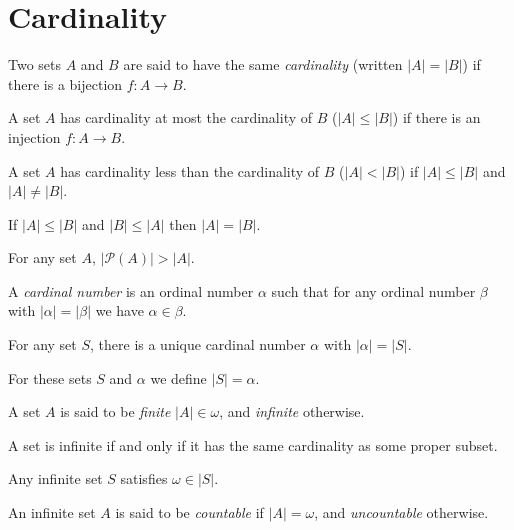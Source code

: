 \chapter{Cardinality}
\begin{defn}
  Two sets $A$ and $B$ are said to have the same \emph{cardinality} (written
  $|A|=|B|$) if there is a bijection $f:A\to B$.

  A set $A$ has cardinality at most the cardinality of $B$ ($|A|\le|B|$) if
  there is an injection $f:A\to B$.

  A set $A$ has cardinality less than the cardinality of $B$ ($|A|<|B|$) if
  $|A|\le|B|$ and $|A|\ne|B|$.
\end{defn}
\begin{thm}
  If $|A|\le|B|$ and $|B|\le|A|$ then $|A|=|B|$.
\end{thm}
\begin{thm}
  For any set $A$, $|\mathcal P(A)|>|A|$.
\end{thm}
\begin{defn}
  A \emph{cardinal number} is an ordinal number $\alpha$ such that for any
  ordinal number $\beta$ with $|\alpha|=|\beta|$ we have $\alpha\in\beta$.
\end{defn}
\begin{prop}
  For any set $S$, there is a unique cardinal number $\alpha$ with
  $|\alpha|=|S|$.
\end{prop}
\begin{defn}
  For these sets $S$ and $\alpha$ we define $|S|=\alpha$.
\end{defn}
\begin{defn}
  A set $A$ is said to be \emph{finite} $|A|\in\omega$, and \emph{infinite}
  otherwise.
\end{defn}
\begin{prop}
  A set is infinite if and only if it has the same cardinality as some proper
  subset.
\end{prop}
\begin{prop}
  Any infinite set $S$ satisfies $\omega\in|S|$.
\end{prop}
\begin{defn}
  An infinite set $A$ is said to be \emph{countable} if $|A|=\omega$, and
  \emph{uncountable} otherwise.
\end{defn}
